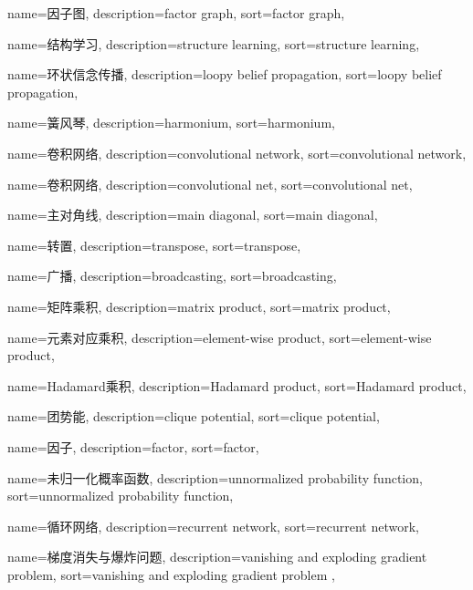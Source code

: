 {
  name=因子图,
  description={factor graph},
  sort={factor graph},
}

{
  name=结构学习,
  description={structure learning},
  sort={structure learning},
}

{
  name=环状信念传播,
  description={loopy belief propagation},
  sort={loopy belief propagation},
}

{
  name=簧风琴,
  description={harmonium},
  sort={harmonium},
}

{
  name=卷积网络,
  description={convolutional network},
  sort={convolutional network},
}


{
	name=卷积网络,
	description={convolutional net},
	sort={convolutional net},
}

{
  name=主对角线,
  description={main diagonal},
  sort={main diagonal},
}

{
  name=转置,
  description={transpose},
  sort={transpose},
}

{
  name=广播,
  description={broadcasting},
  sort={broadcasting},
}

{
  name=矩阵乘积,
  description={matrix product},
  sort={matrix product},
}

{
  name=元素对应乘积,
  description={element-wise product},
  sort={element-wise product},
}

{
  name=Hadamard乘积,
  description={Hadamard product},
  sort={Hadamard product},
}

{
  name=团势能,
  description={clique potential},
  sort={clique potential},
}

{
  name=因子,
  description={factor},
  sort={factor},
}

{
  name=未归一化概率函数,
  description={unnormalized probability function},
  sort={unnormalized probability function},
}

{
  name=循环网络,
  description={recurrent network},
  sort={recurrent network},
}

{
	name=梯度消失与爆炸问题,
	description={vanishing and exploding gradient problem},
	sort={vanishing and exploding gradient problem },
}

